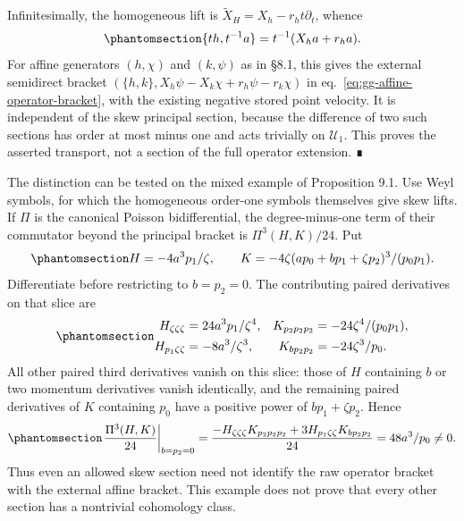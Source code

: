 \documentclass[
  english,
  11pt,
  reqno]{amsart}
\begin{document}
Infinitesimally, the homogeneous lift is
\(\widetilde X_H=X_h-r_ht\partial_t\), whence
\begin{equation}\protect\phantomsection\label{eq:gg-op-unit-action}{
 \{th,t^{-1}a\}=t^{-1}(X_ha+r_ha).
}\end{equation} For affine generators \((h,\chi)\) and \((k,\psi)\) as
in §8.1, this gives the external semidirect bracket
\((\{h,k\},X_h\psi-X_k\chi+r_h\psi-r_k\chi)\) in
eq.~\ref{eq:gg-affine-operator-bracket}, with the existing negative
stored point velocity. It is independent of the skew principal section,
because the difference of two such sections has order at most minus one
and acts trivially on \(\mathscr U_1\). This proves the asserted
transport, not a section of the full operator extension. ∎

The distinction can be tested on the mixed example of Proposition 9.1.
Use Weyl symbols, for which the homogeneous order-one symbols themselves
give skew lifts. If \(\Pi\) is the canonical Poisson bidifferential, the
degree-minus-one term of their commutator beyond the principal bracket
is \(\Pi^3(H,K)/24\). Put
\begin{equation}\protect\phantomsection\label{eq:gg-op-moyal-example}{
 H=-4a^3p_1/\zeta,\qquad
 K=-4\zeta(ap_0+bp_1+\zeta p_2)^3/(p_0p_1).
}\end{equation} Differentiate before restricting to \(b=p_2=0\). The
contributing paired derivatives on that slice are
\begin{equation}\protect\phantomsection\label{eq:gg-op-moyal-derivatives}{
 \begin{aligned}
 H_{\zeta\zeta\zeta}&=24a^3p_1/\zeta^4,&
 K_{p_2p_2p_2}&=-24\zeta^4/(p_0p_1),\\
 H_{p_1\zeta\zeta}&=-8a^3/\zeta^3,&
 K_{bp_2p_2}&=-24\zeta^3/p_0 .
 \end{aligned}
}\end{equation} All other paired third derivatives vanish on this slice:
those of \(H\) containing \(b\) or two momentum derivatives vanish
identically, and the remaining paired derivatives of \(K\) containing
\(p_0\) have a positive power of \(bp_1+\zeta p_2\). Hence
\begin{equation}\protect\phantomsection\label{eq:gg-op-moyal-defect}{
 \left.\frac{\Pi^3(H,K)}{24}\right|_{b=p_2=0}
 =\frac{-H_{\zeta\zeta\zeta}K_{p_2p_2p_2}
          +3H_{p_1\zeta\zeta}K_{bp_2p_2}}{24}
 =48a^3/p_0\ne0 .
}\end{equation} Thus even an allowed skew section need not identify the
raw operator bracket with the external affine bracket. This example does
not prove that every other section has a nontrivial cohomology class.
\end{document}
